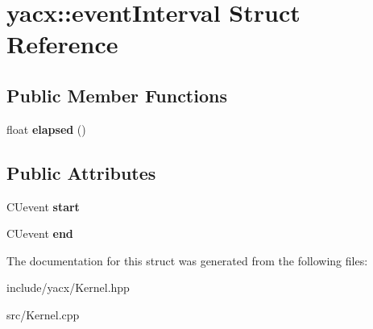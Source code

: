 \hypertarget{structyacx_1_1event_interval}{}\section{yacx\+:\+:event\+Interval Struct Reference}
\label{structyacx_1_1event_interval}
\subsection*{Public Member Functions}
\begin{DoxyCompactItemize}
\item 
\mbox{\label{structyacx_1_1event_interval_a74213451bfa801df9117c6c91bfa9ca8}} 
float {\bfseries elapsed} ()
\end{DoxyCompactItemize}
\subsection*{Public Attributes}
\begin{DoxyCompactItemize}
\item 
\mbox{\label{structyacx_1_1event_interval_a2bd8443ac3ab014c362febbb9efd43b1}} 
C\+Uevent {\bfseries start}
\item 
\mbox{\label{structyacx_1_1event_interval_accea7d9c8870ccd71dca60a41f3349e3}} 
C\+Uevent {\bfseries end}
\end{DoxyCompactItemize}


The documentation for this struct was generated from the following files\+:\begin{DoxyCompactItemize}
\item 
include/yacx/Kernel.\+hpp\item 
src/Kernel.\+cpp\end{DoxyCompactItemize}
